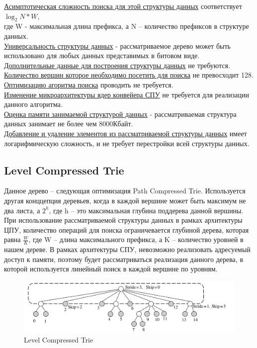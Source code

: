 \documentclass[a4peper, 12pt, titlepage, finall]{extreport}
\begin{document}
            \underline{Асимптотическая сложность поиска для этой структуры данных} соответствует {\ttfamily $\log_2{N*W}$},\\
            где {\ttfamily W} - максимальная длина префикса, а {\ttfamily N} -- количество префиксов в структуре данных.\\
            \underline{Универсальность структуры данных} - рассматриваемое дерево может быть использовано для любых данных представимых в битовом виде.\\
            \underline{Дополнительные данные для построения структуры данных} не требуются.\\
            \underline{Количество вершин которое необходимо посетить для поиска} не превосходит 128.\\
            \underline{Оптимизацию агоритма поиска} проводить не требуется.\\
            \underline{Изменение микроархитектуры ядер конвейера СПУ} не требуется для реализации данного алгоритма.\\
            \underline{Оценка памяти занимаемой структурой данных} - рассматриваемая структура данных занимает не более чем 8000Кбайт.\\
            \underline{Добавление и удаление элементов из рассматриваемой структуры данных} имеет логарифмическую сложность, и не требует перестройки всей структуры данных.\\

        \subsection{Level Compressed Trie}
            Данное дерево -- следующая оптимизация Path Compressed Trie. Используется другая конццепция деревьев, когда в каждой вершине
            может быть максимум не два листа, а {\ttfamily $2^h$}, где {\ttfamily h} -- это максимальная глубина поддерева данной вершины.
            При использование рассматриваемой структуры данных в рамках архитектуры ЦПУ, количество операций для поиска ограничевается глубиной дерева,
            которая равна {\ttfamily $\frac{W}{K}$}, где {\ttfamily W} -- длина максимального префикса, а {\ttfamily K} -- количество уровней в нашем дереве.
            В рамках архитектуры СПУ, невозможно реализовать адресуемый доступ к памяти, поэтому будет рассматриваться реализация данного дерева,
            в которой используется линейный поиск в каждой вершине по уровням.

            \begin{figure}[h]
                \includegraphics[width=\textwidth]{level_compressed_trie.png}
                \caption{Level Compressed Trie}
                \label{fig:mesh3}
            \end{figure}
\end{document}
